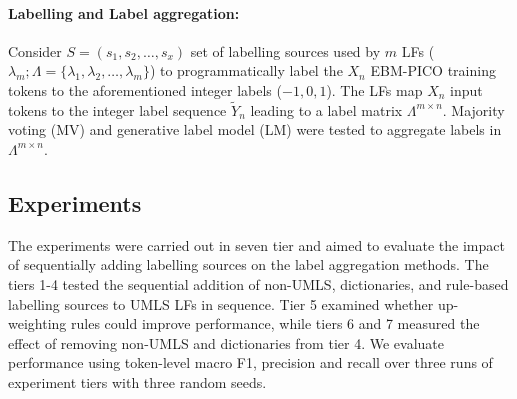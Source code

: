 \documentclass{IOS-Book-Article}
\begin{document}
\paragraph{Labelling and Label aggregation: }
%
Consider $S = (s_{1}, s_{2}, \ldots, s_{x})$ set of labelling sources used by $m$ LFs ($\lambda_{m} ;\Lambda = \{\lambda_{1}, \lambda_{2}, \dotso, \lambda_{m} \}$) to programmatically label the $X_{n}$ EBM-PICO training tokens to the aforementioned integer labels ($-1, 0, 1$).
The LFs map $X_{n}$ input tokens to the integer label sequence $\widetilde{Y}_{n}$ leading to a label matrix $\Lambda^{m \times n}$.
Majority voting (MV) and generative label model (LM) were tested to aggregate labels in $\Lambda^{m \times n}$.
%
%
%
\subsection{Experiments}
%
The experiments were carried out in seven tier and aimed to evaluate the impact of sequentially adding labelling sources on the label aggregation methods.
The tiers 1-4 tested the sequential addition of non-UMLS, dictionaries, and rule-based labelling sources to UMLS LFs in sequence.
Tier 5 examined whether up-weighting rules could improve performance, while tiers 6 and 7 measured the effect of removing non-UMLS and dictionaries from tier 4.
We evaluate performance using token-level macro F1, precision and recall over three runs of experiment tiers with three random seeds.
%
%
%
%
%
%
\end{document}
